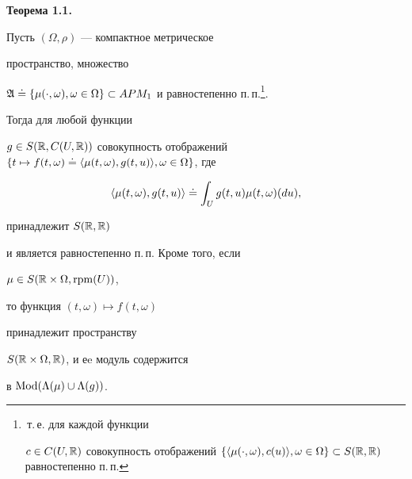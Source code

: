 {\bf Теорема 1.1.} {\it


Пусть $(\Omega,\rho)$ --- компактное метрическое


пространство, множество


$\frak A\doteq\{\mu(\cdot,\omega), \omega\in\Omega\}\subset


APM_{1}$ и равностепенно п.\,п.\footnote{\,т.\,е. для каждой функции


$c\in C(U,\Bbb R)$ совокупность отображений $\{\la\mu(\cdot,\omega),c(u)\ra,


\omega\in\Omega\}\subset S(\Bbb R,\Bbb R)$ равностепенно п.\,п.}.


Тогда для любой функции


$g\in S(\Bbb R,C(U,\Bbb R))$ совокупность отображений $\{t\mapsto


f(t,\omega)\doteq\la\mu(t,\omega),g(t,u)\ra, \omega\in\Omega\}$, где


$$


\la\mu(t,\omega),g(t,u)\ra\doteq\int_{U}g(t,u)\mu(t,\omega)(du),


$$


принадлежит $S(\Bbb R,\Bbb R)$


и является равностепенно п.\,п. Кроме того, если


$\mu\in S(\Bbb R\times\Omega,\operatorname{rpm} (U))$,


то функция $(t,\omega)\mapsto f(t,\omega)$


принадлежит пространству


$S(\Bbb R\times\Omega,\Bbb R)$, и еe модуль содержится


в $\operatorname{Mod}(\Lambda(\mu)\cup\Lambda(g))$.


}






